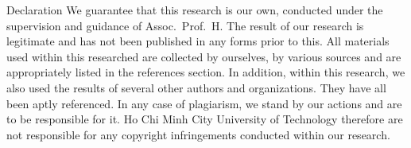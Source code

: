 \begin{preface}{Declaration}
  We guarantee that this research is our own, conducted under the supervision and guidance of Assoc.\ Prof.\ H.
  The result of our research is legitimate and has not been published in any forms prior to this.
  All materials used within this researched are collected by ourselves, by various sources and are appropriately listed in the references section.
  In addition, within this research, we also used the results of several other authors and organizations.
  They have all been aptly referenced.
  In any case of plagiarism, we stand by our actions and are to be responsible for it.
  Ho Chi Minh City University of Technology therefore are not responsible for any copyright infringements conducted within our research.
\end{preface}
